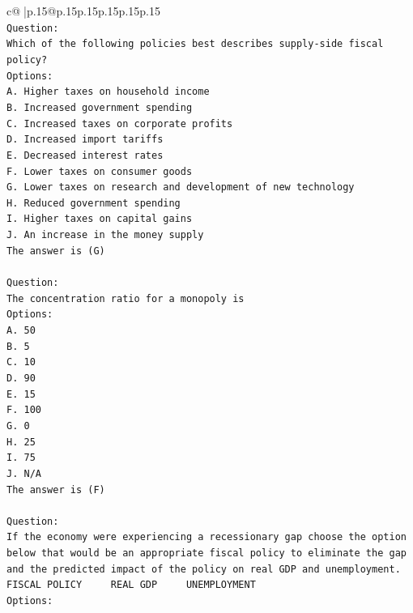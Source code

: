 \documentclass{article}
\begin{document}
{\begin{supertabular}{c@{$\;$}|p{.15\linewidth}@{}p{.15\linewidth}p{.15\linewidth}p{.15\linewidth}p{.15\linewidth}p{.15\linewidth}}
{{{\\ 
\texttt{Question:} \\
\texttt{Which of the following policies best describes supply{-}side fiscal policy?} \\
\texttt{Options:} \\
\texttt{A. Higher taxes on household income} \\
\texttt{B. Increased government spending} \\
\texttt{C. Increased taxes on corporate profits} \\
\texttt{D. Increased import tariffs} \\
\texttt{E. Decreased interest rates} \\
\texttt{F. Lower taxes on consumer goods} \\
\texttt{G. Lower taxes on research and development of new technology} \\
\texttt{H. Reduced government spending} \\
\texttt{I. Higher taxes on capital gains} \\
\texttt{J. An increase in the money supply} \\
\texttt{The answer is (G)} \\
\\ 
\texttt{Question:} \\
\texttt{The concentration ratio for a monopoly is} \\
\texttt{Options:} \\
\texttt{A. 50} \\
\texttt{B. 5} \\
\texttt{C. 10} \\
\texttt{D. 90} \\
\texttt{E. 15} \\
\texttt{F. 100} \\
\texttt{G. 0} \\
\texttt{H. 25} \\
\texttt{I. 75} \\
\texttt{J. N/A} \\
\texttt{The answer is (F)} \\
\\ 
\texttt{Question:} \\
\texttt{If the economy were experiencing a recessionary gap choose the option below that would be an appropriate fiscal policy to eliminate the gap and the predicted impact of the policy on real GDP and unemployment. FISCAL POLICY ~~~ REAL GDP ~~~ UNEMPLOYMENT} \\
\texttt{Options:} \\
}}}
\end{supertabular}}
\end{document}
